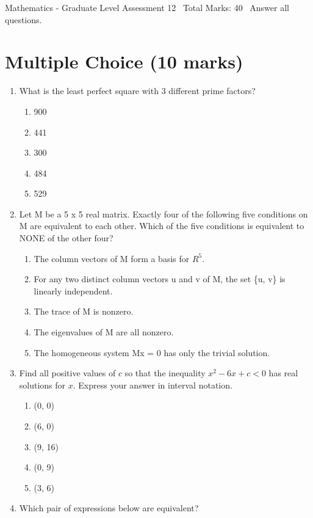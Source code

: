 \documentclass[12pt]{article}
\begin{document}
\begin{center}
Mathematics - Graduate Level Assessment 12 \
Total Marks: 40 \
Answer all questions.
\end{center}

\section*{Multiple Choice (10 marks)}
\begin{enumerate}[label=\arabic*.]
\item What is the least perfect square with 3 different prime factors?
\begin{enumerate}[label=(\alph*)]
    \item 900
    \item 441
    \item 300
    \item 484
    \item 529
\end{enumerate}
\item Let M be a 5 x 5 real matrix. Exactly four of the following five conditions on M are equivalent to each other. Which of the five conditions is equivalent to NONE of the other four?
\begin{enumerate}[label=(\alph*)]
    \item The column vectors of M form a basis for $R^5$.
    \item For any two distinct column vectors u and v of M, the set \{u, v\} is linearly independent.
    \item The trace of M is nonzero.
    \item The eigenvalues of M are all nonzero.
    \item The homogeneous system Mx = 0 has only the trivial solution.
\end{enumerate}
\item Find all positive values of $c$ so that the inequality $x^2-6 x+c<0$ has real solutions for $x$. Express your answer in interval notation.
\begin{enumerate}[label=(\alph*)]
    \item (0, 0)
    \item (6, 0)
    \item (9, 16)
    \item (0, 9)
    \item (3, 6)
\end{enumerate}
\item Which pair of expressions below are equivalent?
\begin{enumerate}[label=(\alph*)]

\end{enumerate}
\end{enumerate}
\end{document}
